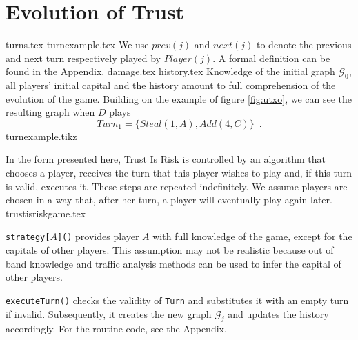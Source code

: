 \section{Evolution of Trust}
  {turns.tex}
  {turnexample.tex}
  We use $prev\left(j\right)$ and $next\left(j\right)$ to denote the previous and next turn respectively played by
  $Player(j)$. A formal definition can be found in the Appendix.
  {damage.tex}
  {history.tex}
  \noindent Knowledge of the initial graph $\mathcal{G}_0$, all players' initial capital and the history amount to full
  comprehension of the evolution of the game. Building on the example of figure \ref{fig:utxo}, we can see the resulting graph
  when $D$ plays
  \begin{equation}
  \label{turnexample}
    Turn_1 = \{Steal\left(1, A\right), Add\left(4, C\right)\} \enspace.
  \end{equation}
  {turnexample.tikz}

  \noindent In the form presented here, Trust Is Risk is controlled by an algorithm that chooses a player, receives the turn
  that this player wishes to play and, if this turn is valid, executes it. These steps are repeated indefinitely. We assume
  players are chosen in a way that, after her turn, a player will eventually play again later.
  {trustisriskgame.tex}

  \noindent \texttt{strategy[}$A$\texttt{]()} provides player $A$ with full knowledge of the game, except for the capitals of
  other players. This assumption may not be realistic because out of band knowledge and traffic analysis methods can be used
  to infer the capital of other players.

  \texttt{executeTurn()} checks the validity of \texttt{Turn} and substitutes it with an empty turn if invalid.
  Subsequently, it creates the new graph $\mathcal{G}_j$ and updates the history accordingly. For the routine code,
  see the Appendix.
